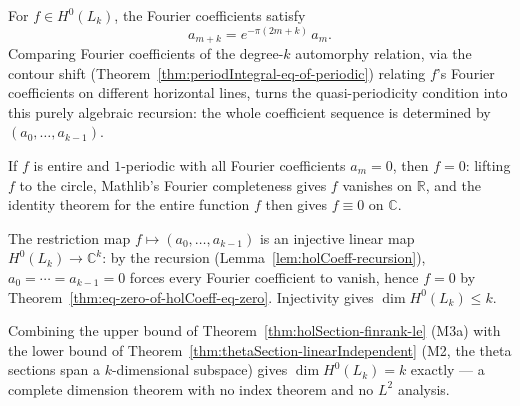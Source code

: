 \begin{lemma}
  \label{lem:holCoeff-recursion}
  \leanok
  For $f \in H^0(L_k)$, the Fourier coefficients satisfy
  \[
    a_{m+k} = e^{-\pi(2m+k)} \, a_m.
  \]
  Comparing Fourier coefficients of the degree-$k$ automorphy relation, via the contour shift
  (Theorem~\ref{thm:periodIntegral-eq-of-periodic}) relating $f$'s Fourier coefficients on
  different horizontal lines, turns the quasi-periodicity condition into this purely algebraic
  recursion: the whole coefficient sequence is determined by $(a_0, \dots, a_{k-1})$.
\end{lemma}

\begin{theorem}[Fourier completeness: vanishing coefficients imply $f = 0$]
  \label{thm:eq-zero-of-holCoeff-eq-zero}
  \leanok
  If $f$ is entire and $1$-periodic with all Fourier coefficients $a_m = 0$, then $f = 0$:
  lifting $f$ to the circle, Mathlib's Fourier completeness gives $f$ vanishes on $\mathbb{R}$,
  and the identity theorem for the entire function $f$ then gives $f \equiv 0$ on $\mathbb{C}$.
\end{theorem}

\begin{theorem}
  \label{thm:holSection-finrank-le}
  \leanok
  The restriction map $f \mapsto (a_0, \dots, a_{k-1})$ is an injective linear map
  $H^0(L_k) \to \mathbb{C}^k$: by the recursion (Lemma~\ref{lem:holCoeff-recursion}),
  $a_0 = \cdots = a_{k-1} = 0$ forces every Fourier coefficient to vanish, hence $f = 0$ by
  Theorem~\ref{thm:eq-zero-of-holCoeff-eq-zero}. Injectivity gives $\dim H^0(L_k) \leq k$.
\end{theorem}

\begin{theorem}[The exact count: $\dim H^0(L_k) = k$]
  \label{thm:holSection-finrank-eq}
  \leanok
  Combining the upper bound of Theorem~\ref{thm:holSection-finrank-le} (M3a) with the lower
  bound of Theorem~\ref{thm:thetaSection-linearIndependent} (M2, the theta sections span a
  $k$-dimensional subspace) gives $\dim H^0(L_k) = k$ exactly — a complete dimension theorem
  with no index theorem and no $L^2$ analysis.
\end{theorem}


